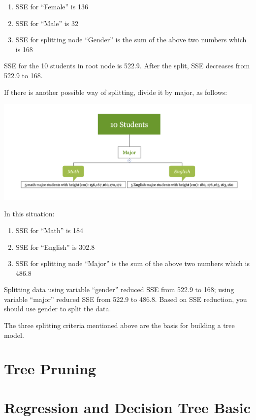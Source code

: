 \documentclass[12pt,]{krantz}
\providecommand{\tightlist}{%
  \setlength{\itemsep}{0pt}\setlength{\parskip}{0pt}}
\theoremstyle{definition}
\theoremstyle{definition}
\theoremstyle{definition}
\theoremstyle{remark}
\begin{document}
\begin{enumerate}
\def\labelenumi{\arabic{enumi}.}
\tightlist
\item
  SSE for ``Female'' is 136
\item
  SSE for ``Male'' is 32
\item
  SSE for splitting node ``Gender'' is the sum of the above two numbers
  which is 168
\end{enumerate}

SSE for the 10 students in root node is 522.9. After the split, SSE
decreases from 522.9 to 168.

If there is another possible way of splitting, divide it by major, as
follows:

\includegraphics{images/varEN2.png}

In this situation:

\begin{enumerate}
\def\labelenumi{\arabic{enumi}.}
\tightlist
\item
  SSE for ``Math'' is 184
\item
  SSE for ``English'' is 302.8
\item
  SSE for splitting node ``Major'' is the sum of the above two numbers
  which is 486.8
\end{enumerate}

Splitting data using variable ``gender'' reduced SSE from 522.9 to 168;
using variable ``major'' reduced SSE from 522.9 to 486.8. Based on SSE
reduction, you should use gender to split the data.

The three splitting criteria mentioned above are the basis for building
a tree model.

\section{Tree Pruning}\label{tree-pruning}

\section{Regression and Decision Tree
Basic}\label{regression-and-decision-tree-basic}
\end{document}
